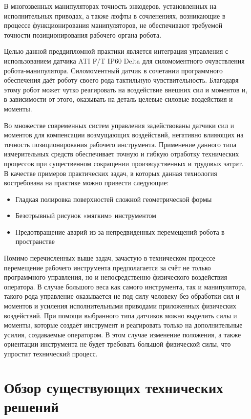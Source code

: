 \documentclass[a4paper,14pt,russian]{extreport} \usepackage{extsizes}
\begin{document}
	
	\tableofcontents
	\newpage
	В многозвенных манипуляторах точность энкодеров, установленных на исполнительных приводах, а также люфты в сочленениях, возникающие в процессе функционирования манипуляторов, не обеспечивают требуемой точности  позиционирования рабочего органа робота. 
	
	Целью данной преддипломной практики является интеграция управления с использованием датчика ATI F/T IP60 Delta для силомоментного очувствления робота-манипулятора. Силомоментный датчик в сочетании программного обеспечения даёт  роботу своего рода тактильную чувствительность. Благодаря этому робот может чутко реагировать на воздействие внешних сил и моментов и, в зависимости от этого, оказывать на деталь целевые силовые воздействия и моменты.
	
	Во множестве современных систем управления  задействованы датчики сил и моментов для компенсации возмущающих воздействий, негативно влияющих на точность позиционирования рабочего инструмента.  Применение данного типа измерительных средств обеспечивает точную и гибкую отработку технических  процессов при существенном сокращении производственных и трудовых затрат. В качестве примеров практических задач, в которых данная технология востребована на практике можно привести следующие:
	\begin{itemize} 
	\item{Гладкая полировка поверхностей сложной геометрической формы}
	\item{Безотрывный рисунок «мягким» инструментом}
	\item{Предотвращение аварий из-за непредвиденных перемещений робота в пространстве}
	\end{itemize}	 
	Помимо перечисленных выше задач, зачастую в техническом процессе перемещение рабочего инструмента предполагается за счёт  не только программного управления, но и непосредственно физического воздействия оператора. В случае большого веса как самого инструмента, так и манипулятора, такого рода управление оказывается не под силу человеку без обработки сил и моментов и усиления исполнительными приводами приложенных физических воздействий. При помощи выбранного типа датчиков можно выделить силы и моменты, которые создаёт инструмент и реагировать только на дополнительные усилия, создаваемые оператором. В этом случае изменение положения, а также ориентации инструмента не будет требовать большой физической силы, что упростит технический процесс.
	\chapter {Обзор существующих технических решений}	
\end{document}
